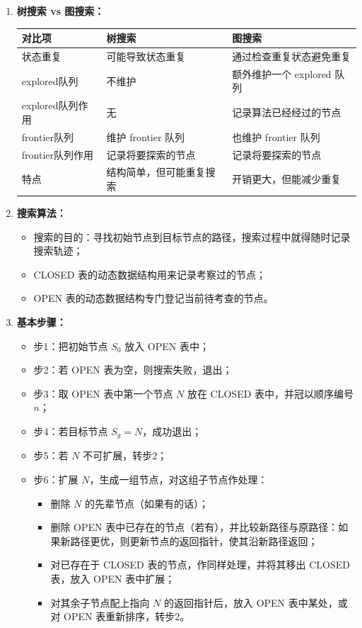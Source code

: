 \documentclass[../main.tex]{subfiles}
\begin{document}
\begin{enumerate}
    \item \textbf{树搜索 vs 图搜索：}
    \begin{table}[h]
    \centering
    \begin{tabular}{lll}
    \toprule
    \textbf{对比项} & \textbf{树搜索} & \textbf{图搜索} \\
    \midrule
    状态重复 & 可能导致状态重复 & 通过检查重复状态避免重复 \\
    explored队列 & 不维护 & 额外维护一个 explored 队列 \\
    explored队列作用 & 无 & 记录算法已经经过的节点 \\
    frontier队列 & 维护 frontier 队列 & 也维护 frontier 队列 \\
    frontier队列作用 & 记录将要探索的节点 & 记录将要探索的节点 \\
    特点 & 结构简单，但可能重复搜索 & 开销更大，但能减少重复 \\
    \bottomrule
    \end{tabular}
    \end{table}
    \item \textbf{搜索算法：}
    \begin{itemize}
        \item 搜索的目的：寻找初始节点到目标节点的路径，搜索过程中就得随时记录搜索轨迹；
        \item CLOSED 表的动态数据结构用来记录考察过的节点；
        \item OPEN 表的动态数据结构专门登记当前待考查的节点。
    \end{itemize}

    \item \textbf{基本步骤：}
    \begin{itemize}
        \item 步1：把初始节点 $S_0$ 放入 OPEN 表中；
        \item 步2：若 OPEN 表为空，则搜索失败，退出；
        \item 步3：取 OPEN 表中第一个节点 $N$ 放在 CLOSED 表中，并冠以顺序编号 $n$；
        \item 步4：若目标节点 $S_g=N$，成功退出；
        \item 步5：若 $N$ 不可扩展，转步2；
        \item 步6：扩展 $N$，生成一组节点，对这组子节点作处理：
        \begin{itemize}
            \item 删除 $N$ 的先辈节点（如果有的话）；
            \item 删除 OPEN 表中已存在的节点（若有），并比较新路径与原路径：如果新路径更优，则更新节点的返回指针，使其沿新路径返回；
            \item 对已存在于 CLOSED 表的节点，作同样处理，并将其移出 CLOSED 表，放入 OPEN 表中扩展；
            \item 对其余子节点配上指向 $N$ 的返回指针后，放入 OPEN 表中某处，或对 OPEN 表重新排序，转步2。
        \end{itemize}
    \end{itemize}
\end{enumerate}
\end{document}
